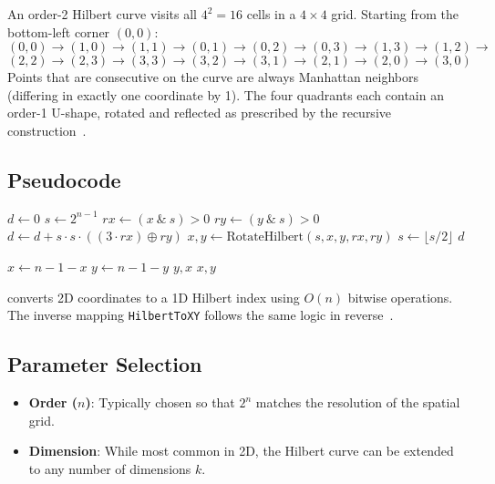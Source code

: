 \begin{example}\label{ex:hilbert_order2}
An order-2 Hilbert curve visits all $4^2 = 16$ cells in a $4 \times 4$ grid. Starting from the bottom-left corner $(0, 0)$:
\[
(0,0) \to (1,0) \to (1,1) \to (0,1) \to (0,2) \to (0,3) \to (1,3) \to (1,2) \to
\]
\[
(2,2) \to (2,3) \to (3,3) \to (3,2) \to (3,1) \to (2,1) \to (2,0) \to (3,0)
\]
Points that are consecutive on the curve are always Manhattan neighbors (differing in exactly one coordinate by 1). The four quadrants each contain an order-1 U-shape, rotated and reflected as prescribed by the recursive construction~\cite{sagan1994}.
\end{example}



\subsection{Pseudocode}
\begin{algorithm}
\caption{Hilbert Curve: Coordinates to Index}\label{alg:xy_to_hilbert}
\begin{algorithmic}
    \State $d \gets 0$
    \State $s \gets 2^{n - 1}$
        \State $rx \gets (x \ \& \ s) > 0$
        \State $ry \gets (y \ \& \ s) > 0$
        \State $d \gets d + s \cdot s \cdot ((3 \cdot rx) \oplus ry)$
        \State $x, y \gets \text{RotateHilbert}(s, x, y, rx, ry)$
        \State $s \gets \lfloor s / 2 \rfloor$
    \EndWhile
    \Return $d$
\EndFunction

\Statex

            \State $x \gets n - 1 - x$
            \State $y \gets n - 1 - y$
        \EndIf
        \Return $y, x$
    \EndIf
    \Return $x, y$
\EndFunction
\end{algorithmic}
\end{algorithm}
 converts 2D coordinates to a 1D Hilbert index using $O(n)$ bitwise operations. The inverse mapping \texttt{HilbertToXY} follows the same logic in reverse~\cite{hilbert1891,sagan1994}.

\subsection{Parameter Selection}
\begin{itemize}
    \item \textbf{Order ($n$)}: Typically chosen so that $2^n$ matches the resolution of the spatial grid.
    \item \textbf{Dimension}: While most common in 2D, the Hilbert curve can be extended to any number of dimensions $k$.
\end{itemize}

